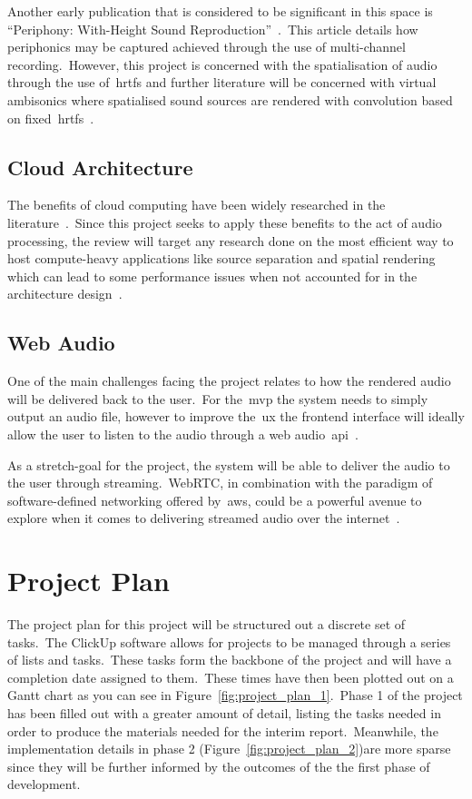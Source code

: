 \documentclass[a4paper, 12pt, british]{article}
\begin{document}
Another early publication that is considered to be significant in this space is ``Periphony: With-Height Sound Reproduction''~\cite{gerzon_periphony}.\ This article details how periphonics may be captured achieved through the use of multi-channel recording.\ However, this project is concerned with the spatialisation of audio through the use of~\glspl{hrtf} and further literature will be concerned with virtual ambisonics where spatialised sound sources are rendered with convolution based on fixed~\glspl{hrtf}~\citep{noisternig_ambisonic}.

\subsection{Cloud Architecture}\label{subsec:cloud-architecture}

The benefits of cloud computing have been widely researched in the literature~\citep{cc_overview}.\ Since this project seeks to apply these benefits to the act of audio processing, the review will target any research done on the most efficient way to host compute-heavy applications like source separation and spatial rendering which can lead to some performance issues when not accounted for in the architecture design~\citep{cc_challenges}.

\subsection{Web Audio}\label{subsec:web-audio}

One of the main challenges facing the project relates to how the rendered audio will be delivered back to the user.\ For the~\gls{mvp} the system needs to simply output an audio file, however to improve the~\gls{ux} the frontend interface will ideally allow the user to listen to the audio through a web audio~\gls{api}~\citep{mdn_audio_api,w3c_audio_api}.

As a stretch-goal for the project, the system will be able to deliver the audio to the user through streaming.\ WebRTC, in combination with the paradigm of software-defined networking offered by~\gls{aws}, could be a powerful avenue to explore when it comes to delivering streamed audio over the internet~\citep{webrtc}.

\section{Project Plan}\label{sec:project-plan}

The project plan for this project will be structured out a discrete set of tasks.\ The ClickUp software allows for projects to be managed through a series of lists and tasks.\ These tasks form the backbone of the project and will have a completion date assigned to them.\ These times have then been plotted out on a Gantt chart as you can see in Figure~\ref{fig:project_plan_1}.\ Phase 1 of the project has been filled out with a greater amount of detail, listing the tasks needed in order to produce the materials needed for the interim report.\ Meanwhile, the implementation details in phase 2 (Figure~\ref{fig:project_plan_2})are more sparse since they will be further informed by the outcomes of the the first phase of development.
\end{document}
